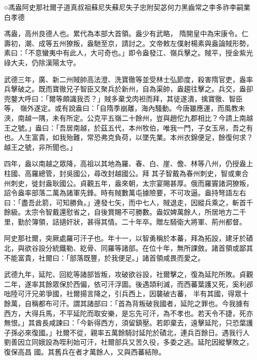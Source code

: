 
\begin{pinyinscope}

 ○馮盎阿史那社爾子道真叔祖蘇尼失蘇尼失子忠附契苾何力黑齒常之李多祚李嗣業白孝德



 馮盎，高州良德人也。累代為本部大首領。盎少有武略，
 隋開皇中為宋康令。仁壽初，潮、成等五州獠叛，盎馳至京，請討之。文帝敕左僕射楊素與盎論賊形勢，素曰：「不意蠻夷中有此人，大可奇也。」即令盎發江、嶺兵擊之。賊平，授金紫光祿大夫，仍除漢陽太守。



 武德三年，廣、新二州賊帥高法澄、洗寶徹等並受林士弘節度，殺害隋官吏，盎率兵擊破之。既而寶徹兄子智臣又聚兵於新州，自為渠帥，盎趨往擊之。兵交，盎卻兜鍪大呼曰：「爾等頗識我否？」賊多棄戈肉袒而拜，其徒遂潰，擒寶徹、智臣等，
 嶺外遂定。或有說盎曰：「自隋季崩離，海內騷動。今唐雖應運，而風教未浹，南越一隅，未有所定。公克平五嶺二十餘州，豈與趙佗九郡相比？今請上南越王之號。」盎曰：「吾居南越，於茲五代，本州牧伯，唯我一門，子女玉帛，吾之有也。人生富貴，如我殆難，常恐弗克負荷，以墜先業。本州衣錦便足，餘復何求？越王之號，非所聞也。」



 四年，盎以南越之眾降，高祖以其地為羅、春、白、崖、儋、林等八州，仍授盎上柱國、高羅總管，封吳國公，尋改封越國公。拜
 其子智戴為春州刺史，智或東合州刺史，徙封盎耿國公。貞觀五年，盎來朝，太宗宴賜甚厚。俄而羅竇諸洞獠叛，詔令盎率部落二萬為諸軍先鋒。時有賊數萬屯據險要，不可攻逼。盎持弩語左右曰：「盡吾此箭，可知勝負。」連發七矢，而中七人，賊退走，因縱兵乘之，斬首千餘級。太宗令智戴還慰省之，自後賞賜不可勝數。盎奴婢萬餘人，所居地方二千里，勤於簿領，詰擿奸狀，甚得其情。二十年卒。贈左騎衛大將軍、荊州都督。



 阿史那社爾，突厥處羅可汗子也。年十一，以智勇稱於本蕃，拜為拓設，建牙於磧北，與欲谷設分統鐵勒、紇骨、同羅等諸部。在位十年，無所課斂。諸首領或鄙其不能富貴，社爾曰：「部落既豐，於我便足。」諸首領咸畏而愛之。



 武德九年，延陀、回紇等諸部皆叛，攻破欲谷設，社爾擊之，復為延陀所敗。貞觀二年，遂率其餘眾保於西偏，依可汗浮圖。後遇頡利滅，而西蕃葉護又死，奚利邲咄陸可汗兄弟爭國，社爾揚言降之，引兵西上，因襲破古蕃，
 半有其國，得眾十餘萬，自稱都布可汗。謂其諸部曰：「首為背叛破我國者，延陀之罪也。今我據有西方，大得兵馬，不平延陀而取安樂，是忘先可汗，為不孝也。若天令不捷，死亦無恨。」其酋長咸諫曰：「今新得西方，須留鎮壓。若即棄去，遠擊延陀，只恐葉護子孫必來復國。」社爾不從，親率五萬餘騎討延陀於磧北，連兵百餘日。遇我行人劉善因立同娥設為咥利始可汗，社爾部兵又苦久役，多委之逃。延陀因縱擊敗之，復保高昌
 國。其舊兵在者才萬餘人，又與西蕃結隙。




\end{pinyinscope}
